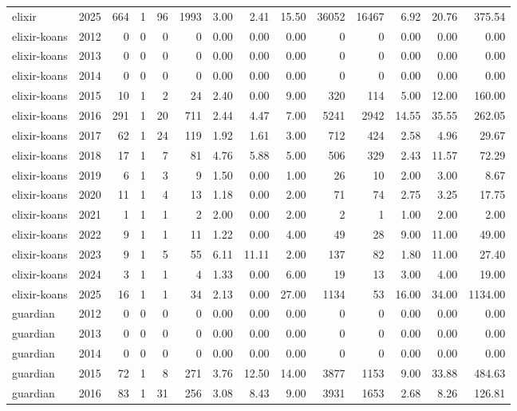 \begin{table}[htbp]
\begin{tabular}{lrrrrrrrrrrrrr}
elixir & 2025 & 664 & 1 & 96 & 1993 & 3.00 & 2.41 & 15.50 & 36052 & 16467 & 6.92 & 20.76 & 375.54 \\
elixir-koans & 2012 & 0 & 0 & 0 & 0 & 0.00 & 0.00 & 0.00 & 0 & 0 & 0.00 & 0.00 & 0.00 \\
elixir-koans & 2013 & 0 & 0 & 0 & 0 & 0.00 & 0.00 & 0.00 & 0 & 0 & 0.00 & 0.00 & 0.00 \\
elixir-koans & 2014 & 0 & 0 & 0 & 0 & 0.00 & 0.00 & 0.00 & 0 & 0 & 0.00 & 0.00 & 0.00 \\
elixir-koans & 2015 & 10 & 1 & 2 & 24 & 2.40 & 0.00 & 9.00 & 320 & 114 & 5.00 & 12.00 & 160.00 \\
elixir-koans & 2016 & 291 & 1 & 20 & 711 & 2.44 & 4.47 & 7.00 & 5241 & 2942 & 14.55 & 35.55 & 262.05 \\
elixir-koans & 2017 & 62 & 1 & 24 & 119 & 1.92 & 1.61 & 3.00 & 712 & 424 & 2.58 & 4.96 & 29.67 \\
elixir-koans & 2018 & 17 & 1 & 7 & 81 & 4.76 & 5.88 & 5.00 & 506 & 329 & 2.43 & 11.57 & 72.29 \\
elixir-koans & 2019 & 6 & 1 & 3 & 9 & 1.50 & 0.00 & 1.00 & 26 & 10 & 2.00 & 3.00 & 8.67 \\
elixir-koans & 2020 & 11 & 1 & 4 & 13 & 1.18 & 0.00 & 2.00 & 71 & 74 & 2.75 & 3.25 & 17.75 \\
elixir-koans & 2021 & 1 & 1 & 1 & 2 & 2.00 & 0.00 & 2.00 & 2 & 1 & 1.00 & 2.00 & 2.00 \\
elixir-koans & 2022 & 9 & 1 & 1 & 11 & 1.22 & 0.00 & 4.00 & 49 & 28 & 9.00 & 11.00 & 49.00 \\
elixir-koans & 2023 & 9 & 1 & 5 & 55 & 6.11 & 11.11 & 2.00 & 137 & 82 & 1.80 & 11.00 & 27.40 \\
elixir-koans & 2024 & 3 & 1 & 1 & 4 & 1.33 & 0.00 & 6.00 & 19 & 13 & 3.00 & 4.00 & 19.00 \\
elixir-koans & 2025 & 16 & 1 & 1 & 34 & 2.13 & 0.00 & 27.00 & 1134 & 53 & 16.00 & 34.00 & 1134.00 \\
guardian & 2012 & 0 & 0 & 0 & 0 & 0.00 & 0.00 & 0.00 & 0 & 0 & 0.00 & 0.00 & 0.00 \\
guardian & 2013 & 0 & 0 & 0 & 0 & 0.00 & 0.00 & 0.00 & 0 & 0 & 0.00 & 0.00 & 0.00 \\
guardian & 2014 & 0 & 0 & 0 & 0 & 0.00 & 0.00 & 0.00 & 0 & 0 & 0.00 & 0.00 & 0.00 \\
guardian & 2015 & 72 & 1 & 8 & 271 & 3.76 & 12.50 & 14.00 & 3877 & 1153 & 9.00 & 33.88 & 484.63 \\
guardian & 2016 & 83 & 1 & 31 & 256 & 3.08 & 8.43 & 9.00 & 3931 & 1653 & 2.68 & 8.26 & 126.81 \\

\end{tabular}
\end{table}
